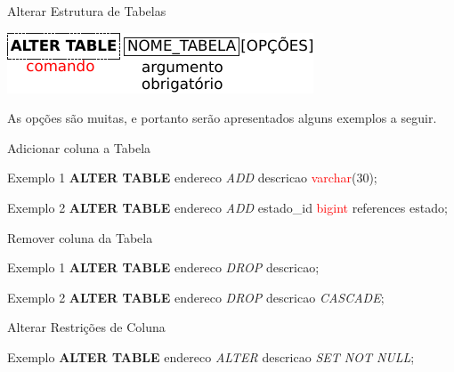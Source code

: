 \documentclass[xcolor=x11names,compress]{beamer}
\begin{document}
\begin{frame}{Alterar Estrutura de Tabelas}

\centering \includegraphics[keepaspectratio,width=\textwidth]{alter_table}

\begin{block}{}
As opções são muitas, e portanto serão apresentados alguns exemplos a seguir.
\end{block}

\end{frame}

\begin{frame}{Adicionar coluna a Tabela}

\begin{alertblock}{Exemplo 1}
\textbf{ALTER TABLE} endereco \textit{ADD} descricao \textcolor{red}{varchar}(30);
\end{alertblock}

\begin{alertblock}{Exemplo 2}
\textbf{ALTER TABLE} endereco \textit{ADD} estado\_id \textcolor{red}{bigint} references estado;
\end{alertblock}

\end{frame}

\begin{frame}{Remover coluna da Tabela}

\begin{alertblock}{Exemplo 1}
\textbf{ALTER TABLE} endereco \textit{DROP} descricao;
\end{alertblock}

\begin{alertblock}{Exemplo 2}
\textbf{ALTER TABLE} endereco \textit{DROP} descricao \textit{CASCADE};
\end{alertblock}

\end{frame}

\begin{frame}{Alterar Restrições de Coluna}

\begin{alertblock}{Exemplo }
\textbf{ALTER TABLE} endereco \textit{ALTER} descricao \textit{SET NOT NULL};
\end{alertblock}

\end{frame}
\end{document}
